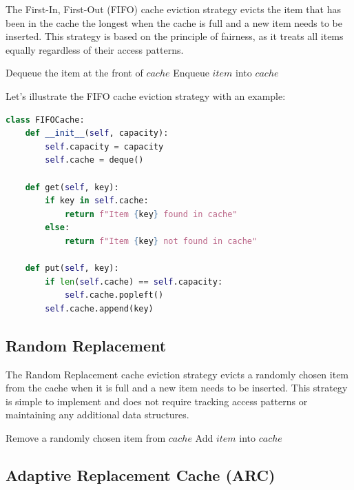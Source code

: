 \documentclass[12pt]{book} %
\begin{document}
The First-In, First-Out (FIFO) cache eviction strategy evicts the item that has been in the cache the longest when the cache is full and a new item needs to be inserted. This strategy is based on the principle of fairness, as it treats all items equally regardless of their access patterns.
\FloatBarrier
\begin{algorithm}
\caption{FIFO Cache Eviction}
\begin{algorithmic}[1]
        \State Dequeue the item at the front of $cache$
    \EndIf
    \State Enqueue $item$ into $cache$
\EndFunction
\end{algorithmic}
\end{algorithm}
\FloatBarrier
Let's illustrate the FIFO cache eviction strategy with an example:
\FloatBarrier
\begin{lstlisting}[language=Python]
class FIFOCache:
    def __init__(self, capacity):
        self.capacity = capacity
        self.cache = deque()

    def get(self, key):
        if key in self.cache:
            return f"Item {key} found in cache"
        else:
            return f"Item {key} not found in cache"

    def put(self, key):
        if len(self.cache) == self.capacity:
            self.cache.popleft()
        self.cache.append(key)
\end{lstlisting}
\FloatBarrier

\subsection{Random Replacement}

The Random Replacement cache eviction strategy evicts a randomly chosen item from the cache when it is full and a new item needs to be inserted. This strategy is simple to implement and does not require tracking access patterns or maintaining any additional data structures.
\FloatBarrier
\begin{algorithm}
\caption{Random Replacement Cache Eviction}
\begin{algorithmic}[1]
        \State Remove a randomly chosen item from $cache$
    \EndIf
    \State Add $item$ into $cache$
\EndFunction
\end{algorithmic}
\end{algorithm}
\FloatBarrier

\subsection{Adaptive Replacement Cache (ARC)}
\end{document}
